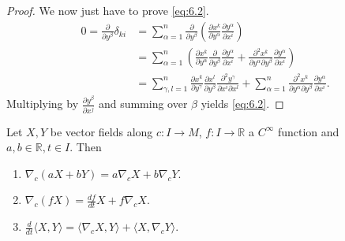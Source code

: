 \begin{proof}
We now just have to prove \eqref{eq:6.2}.
\[
\begin{aligned}
0 = \frac{\partial}{\partial y^{\beta}}\delta_{ki} 
&= \sum_{\alpha=1}^n \frac{\partial}{\partial y^{\beta}}\left( \frac{\partial x^k}{\partial y^{\alpha}}\frac{\partial y^{\alpha}}{\partial x^i} \right) \\
&= \sum_{\alpha=1}^n \left(\frac{\partial x^k}{\partial y^{\alpha}}\frac{\partial}{\partial y^{\beta}}\frac{\partial y^{\alpha}}{\partial x^i}  + \frac{\partial^2 x^k}{\partial y^{\alpha}\partial y^{\beta}}\frac{\partial y^{\alpha}}{\partial x^i}\right) \\
&= \sum_{\gamma,l=1}^n \frac{\partial x^k}{\partial y^{\gamma}}\frac{\partial x^l}{\partial y^{\beta}}\frac{\partial^2 y^{\gamma}}{\partial x^i \partial x^l} + \sum_{\alpha=1}^n \frac{\partial^2 x^k}{\partial y^{\alpha}\partial y^{\beta}}\frac{\partial y^{\alpha}}{\partial x^i}.
\end{aligned}
\]
Multiplying by $\frac{\partial y^{\beta}}{\partial x^j}$ and summing over $\beta$ yields \eqref{eq:6.2}.
\end{proof}

\begin{proposition}
Let $X,Y$ be vector fields along $c:I \to M$,  $f:I \to \mathbb{R}$ a $C^{\infty}$ function and $a, b \in \mathbb{R}, t \in I$. Then
\begin{enumerate}[label=(\arabic*), ref=Proposition \theproposition~(\arabic*)]
    \item \label{prop:covariant_derivative_linearity}$\nabla_c(aX + bY) = a\nabla_cX + b\nabla_cY$.
    \item \label{prop:covariant_derivative_product_rule}$\nabla_c(fX) = \frac{df}{dt}X + f\nabla_cX$.
    \item \label{prop:covariant_derivative_leibniz}$\frac{d}{dt}\langle X, Y \rangle = \langle \nabla_cX, Y \rangle + \langle X, \nabla_cY \rangle$.
\end{enumerate}
\end{proposition}

